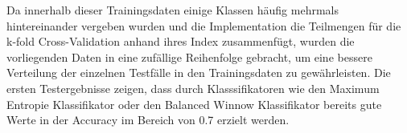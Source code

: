 


Da innerhalb dieser Trainingsdaten einige Klassen häufig mehrmals hintereinander vergeben wurden und die Implementation die Teilmengen für die k-fold Cross-Validation anhand ihres Index zusammenfügt, wurden die vorliegenden Daten in eine zufällige Reihenfolge gebracht, um eine bessere Verteilung der einzelnen Testfälle in den Trainingsdaten zu gewährleisten. Die ersten Testergebnisse zeigen, dass durch Klasssifikatoren wie den Maximum Entropie Klassifikator oder den Balanced Winnow Klassifikator bereits gute Werte in der Accuracy im Bereich von 0.7 erzielt werden. 

